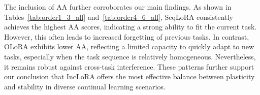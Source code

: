 \documentclass[letterpaper]{article} %
\begin{document}
The inclusion of AA further corroborates our main findings. As shown in Tables~\ref{tab:order1_3_all} and~\ref{tab:order4_6_all}, SeqLoRA consistently achieves the highest AA scores, indicating a strong ability to fit the current task. However, this often leads to increased forgetting of previous tasks. In contrast, OLoRA exhibits lower AA, reflecting a limited capacity to quickly adapt to new tasks, especially when the task sequence is relatively homogeneous. Nevertheless, it remains robust against cross-task interference. These patterns further support our conclusion that IncLoRA offers the most effective balance between plasticity and stability in diverse continual learning scenarios.






\end{document}

